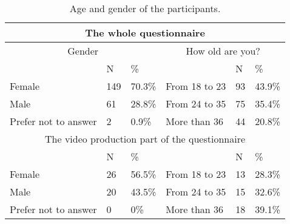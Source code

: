 \begin{table}[htbp]
\centering
\begin{threeparttable}
\caption{Age and gender of the participants.}
\label{tab-01}
\begin{tabular}{llllll}
\toprule
\multicolumn{6}{c}{The whole questionnaire} \\
\midrule
\multicolumn{3}{c}{Gender}  & \multicolumn{3}{c}{How old are you?}\\
	& N & \% & & N& \% \\
Female & 149 & 70.3\% & From 18 to 23 & 93 & 43.9\% \\
Male & 61 & 28.8\% & From 24 to 35 & 75 &35.4\% \\
Prefer not to answer & 2 & 0.9\% & More than 36 & 44 & 20.8\%\\
\multicolumn{6}{c}{\rule{0pt}{4ex}The video production part of the questionnaire} \\
 & N & \% & & N & \% \\
Female & 26 & 56.5\% & From 18 to 23 & 13 & 28.3\% \\
Male & 20 & 43.5\% &From 24 to 35 & 15 & 32.6\% \\
Prefer not to answer & 0 & 0\% & More than 36 & 18 &39.1\% \\
\bottomrule
\end{tabular}
\end{threeparttable}
\end{table}

